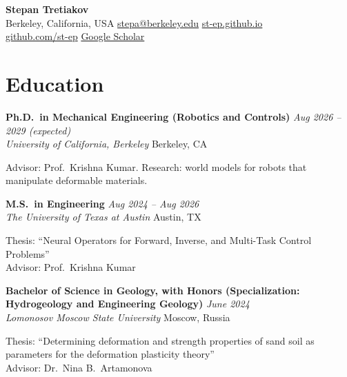 \documentclass[11pt,letterpaper]{article}
\newcommand{\entryhead}[4]{%
    \textbf{#1} \hfill \textit{#2} \\
    \textit{#3} \hfill #4 \par
}
\begin{document}

\begin{center}
    {\huge\bfseries\color{headerblue} Stepan Tretiakov}\\[12pt]
    {\color{darkgray}
    Berkeley, California, USA\quad\textbar\quad
    \href{mailto:stepa@berkeley.edu}{stepa@berkeley.edu}\quad\textbar\quad
    \href{https://st-ep.github.io}{st-ep.github.io}
    }\\[3pt]
    {\color{darkgray}
    \href{https://github.com/st-ep}{github.com/st-ep}\quad\textbar\quad
    \href{https://scholar.google.com/citations?user=p7JCBQYAAAAJ}{Google Scholar}
    }
\end{center}

\vspace{6pt}

\section{Education}

\entryhead{Ph.D.\ in Mechanical Engineering (Robotics and Controls)}{Aug 2026 -- 2029 (expected)}
{University of California, Berkeley}{Berkeley, CA}
Advisor: Prof.\ Krishna Kumar. Research: world models for robots that manipulate deformable materials.

\vspace{8pt}

\entryhead{M.S.\ in Engineering}{Aug 2024 -- Aug 2026}
{The University of Texas at Austin}{Austin, TX}
Thesis: ``Neural Operators for Forward, Inverse, and Multi-Task Control Problems''\\
Advisor: Prof.\ Krishna Kumar

\vspace{8pt}

\entryhead{Bachelor of Science in Geology, with Honors (Specialization: Hydrogeology and Engineering Geology)}{June 2024}
{Lomonosov Moscow State University}{Moscow, Russia}
Thesis: ``Determining deformation and strength properties of sand soil as parameters for the deformation plasticity theory''\\
Advisor: Dr.\ Nina B.\ Artamonova

\end{document}
